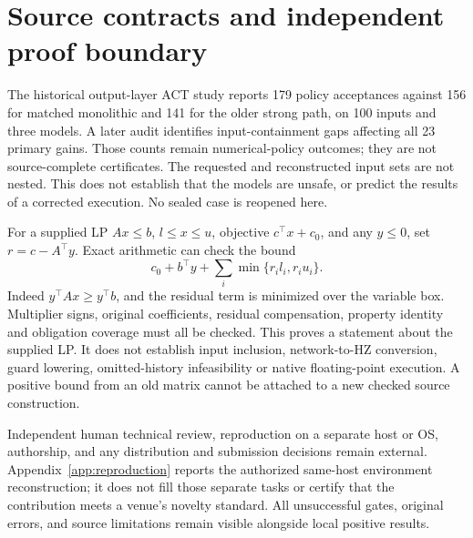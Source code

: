 \section{Source contracts and independent proof boundary}
\label{app:sourceboundary}
The historical output-layer ACT study reports 179 policy acceptances against
156 for matched monolithic and 141 for the older strong path, on 100 inputs
and three models. A later audit identifies input-containment gaps affecting
all 23 primary gains. Those counts remain numerical-policy outcomes; they are
not source-complete certificates. The requested and reconstructed input sets
are not nested. This does not establish that the models are unsafe, or predict
the results of a corrected execution. No sealed case is reopened here.

For a supplied LP $Ax\leq b$, $l\leq x\leq u$, objective $c^\top x+c_0$, and
any $y\leq0$, set $r=c-A^\top y$. Exact arithmetic can check the bound
\[
 c_0+b^\top y+\sum_i\min\{r_i l_i,r_i u_i\}.
\]
Indeed $y^\top Ax\geq y^\top b$, and the residual term is minimized over the
variable box. Multiplier signs, original coefficients, residual compensation,
property identity and obligation coverage must all be checked. This proves a
statement about the supplied LP. It does not establish input inclusion,
network-to-HZ conversion, guard lowering, omitted-history infeasibility or
native floating-point execution. A positive bound from an old matrix cannot
be attached to a new checked source construction.

Independent human technical review, reproduction on a separate host or OS,
authorship, and any distribution and submission decisions remain external.
Appendix~\ref{app:reproduction} reports the authorized same-host environment
reconstruction; it does not fill those separate tasks or certify that the
contribution meets a venue's novelty standard. All unsuccessful gates,
original errors, and source limitations remain visible alongside local
positive results.
